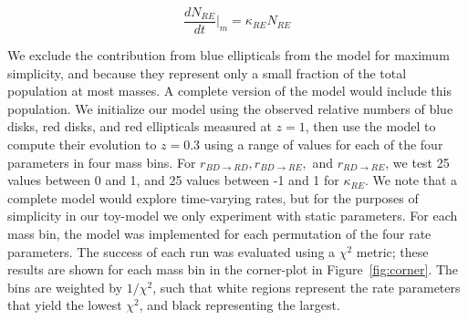 \documentclass[useAMS,usenatbib]{mn2e}
\begin{document}
\begin{equation}
\frac{dN_{RE}}{dt}\Big\rvert_{m} = \kappa_{RE} N_{RE}  
\label{eqn:RE}
\end{equation}

We exclude the contribution from blue ellipticals from the model for maximum simplicity, and because they represent only a small fraction of the total population at most masses. A complete version of the model would include this population. We initialize our model using the observed relative numbers of blue disks, red disks, and red ellipticals measured at $z=1$, then use the model to compute their evolution to $z=0.3$ using a range of values for each of the four parameters in four mass bins. For $r_{BD \rightarrow RD}, r_{BD \rightarrow RE},$ and $r_{RD \rightarrow RE}$, we test 25 values between 0 and 1, and 25 values between -1 and 1 for $\kappa_{RE}$. We note that a complete model would explore time-varying rates, but for the purposes of simplicity in our toy-model we only experiment with static parameters. For each mass bin, the model was implemented for each permutation of the four rate parameters. The success of each run was evaluated using a $\chi^2$ metric; these results are shown for each mass bin in the corner-plot in Figure~\ref{fig:corner}. The bins are weighted by $1/\chi^2$, such that white regions represent the rate parameters that yield the lowest $\chi^2$, and black representing the largest.
\end{document}
